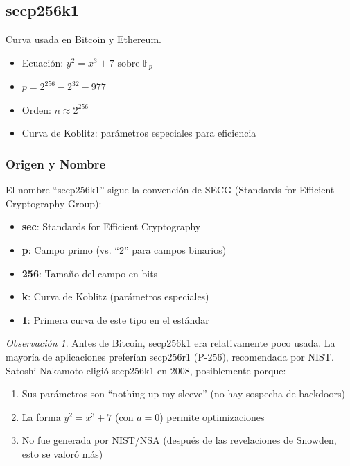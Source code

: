 \documentclass[11pt,a4paper,twoside,openright]{book}
\theoremstyle{definition}
\theoremstyle{plain}
\theoremstyle{remark}
\newtheorem{remark}{Observación}[chapter]
\newcommand{\Fp}{\mathbb{F}_p}
\begin{document}

\subsection{secp256k1}

Curva usada en Bitcoin y Ethereum.
\begin{itemize}
    \item Ecuación: $y^2 = x^3 + 7$ sobre $\Fp$
    \item $p = 2^{256} - 2^{32} - 977$
    \item Orden: $n \approx 2^{256}$
    \item Curva de Koblitz: parámetros especiales para eficiencia
\end{itemize}

\subsubsection{Origen y Nombre}

\begin{intuicion}
El nombre ``secp256k1'' sigue la convención de SECG (Standards for Efficient Cryptography Group):
\begin{itemize}
    \item \textbf{sec}: Standards for Efficient Cryptography
    \item \textbf{p}: Campo primo (vs. ``2'' para campos binarios)
    \item \textbf{256}: Tamaño del campo en bits
    \item \textbf{k}: Curva de Koblitz (parámetros especiales)
    \item \textbf{1}: Primera curva de este tipo en el estándar
\end{itemize}
\end{intuicion}

\begin{remark}
Antes de Bitcoin, secp256k1 era relativamente poco usada. La mayoría de aplicaciones preferían secp256r1 (P-256), recomendada por NIST. Satoshi Nakamoto eligió secp256k1 en 2008, posiblemente porque:
\begin{enumerate}
    \item Sus parámetros son ``nothing-up-my-sleeve'' (no hay sospecha de backdoors)
    \item La forma $y^2 = x^3 + 7$ (con $a = 0$) permite optimizaciones
    \item No fue generada por NIST/NSA (después de las revelaciones de Snowden, esto se valoró más)
\end{enumerate}
\end{remark}
\end{document}
